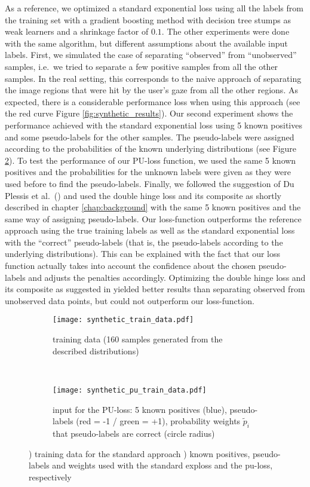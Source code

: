 As a reference, we optimized a standard exponential loss using all the labels from the training set with a gradient boosting method with decision tree stumps as weak learners and a shrinkage factor of $0.1.$ 
The other experiments were done with the same algorithm, but different assumptions about the available input labels. 
First, we simulated the case of separating ``observed'' from ``unobserved'' samples, i.e.\ we tried to separate a few positive samples from all the other samples. 
In the real setting, this corresponds to the naive approach of separating the image regions that were hit by the user's gaze from all the other regions. 
As expected, there is a considerable performance loss when using this approach (see the red curve Figure \ref{fig:synthetic_results}). 
Our second experiment shows the performance achieved with the standard exponential loss using 5 known positives and some pseudo-labels for the other samples. 
The pseudo-labels were assigned according to the probabilities of the known underlying distributions (see Figure \ref{subfig:pu_train}). 
To test the performance of our PU-loss function, we used the same 5 known positives and the probabilities for the unknown labels were given as they were used before to find the pseudo-labels. 
Finally, we followed the suggestion of Du Plessis et al.\ (\cite{plessis2015convex}) and used the double hinge loss and its composite as shortly described in chapter \ref{chap:background} with the same 5 known positives and the same way of assigning pseudo-labels.
Our loss-function outperforms the reference approach using the true training labels as well as the standard exponential loss with the ``correct'' pseudo-labels (that is, the pseudo-labels according to the underlying distributions). 
This can be explained with the fact that our loss function actually takes into account the confidence about the chosen pseudo-labels and adjusts the penalties accordingly. 
Optimizing the double hinge loss and its composite as suggested in \cite{plessis2015convex} yielded better results than separating observed from unobserved data points, but could not outperform our loss-function. 

\begin{figure}[ht]
	\centering
	\begin{subfigure}[h]{0.49\textwidth}
	\texttt{[image: synthetic\_train\_data.pdf]}	
		\caption{training data (160 samples generated from the described distributions)\newline}
		\label{subfig:ref_train}
	\end{subfigure}
	~
	\begin{subfigure}[h]{0.49\textwidth}
	\texttt{[image: synthetic\_pu\_train\_data.pdf]}	
		\caption{input for the PU-loss: 5 known positives (blue), pseudo-labels (red = -1 / green = +1), probability weights $\tilde p_i$ that pseudo-labels are correct (circle radius)}
		\label{subfig:pu_train}
	\end{subfigure}
	\caption{) training data for the standard approach ) known positives, pseudo-labels and weights used with the standard exploss and the pu-loss, respectively}
	\label{fig:synthetic_train_data}
\end{figure}

